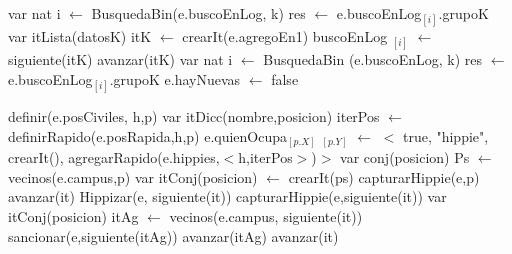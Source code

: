 \begin{algorithm}[H]
\begin{algorithmic}[1]
 
	 
		 \State var nat i $\gets$ BusquedaBin(e.buscoEnLog, k) 
		 \State res $\gets$ e.buscoEnLog$_{[i]}$.grupoK 
	\Else
		 \State var itLista(datosK) itK $\gets$ crearIt(e.agregoEn1) 
		  
		 	\State buscoEnLog $_{[i]}$ $\gets$ siguiente(itK) 
		 	\State avanzar(itK)
		 \EndWhile
		 \State var nat i $\gets$ BusquedaBin (e.buscoEnLog, k) 
		 \State res $\gets$ e.buscoEnLog$_{[i]}$.grupoK 
		 \State e.hayNuevas $\gets$ false 
	\EndIf
\EndFunction
\end{algorithmic}
\end{algorithm}


\begin{algorithm}[H]
\begin{algorithmic}[1]
 
	\State definir(e.posCiviles, h,p) 
	\State var itDicc(nombre,posicion) iterPos $\gets$ definirRapido(e.posRapida,h,p) 
	\State e.quienOcupa$_{[p.X]}$ $_{[p.Y]}$ $\gets$ $<$ true, "hippie", crearIt(), agregarRapido(e.hippies,$<$h,iterPos$>$)$>$ 
	\State var conj(posicion) Ps $\gets$ vecinos(e.campus,p) 
	\State var itConj(posicion) $\gets$ crearIt(ps) 
	 
		\State capturarHippie(e,p) 
	\Else
		 
			 
				\State avanzar(it) 
			\Else
				 
					\State Hippizar(e, siguiente(it)) 
						 
						\State capturarHippie(e,siguiente(it))  
					\EndIf 
				\Else 
					 
						\State var itConj(posicion) itAg $\gets$ vecinos(e.campus, siguiente(it)) 
						 
							 
								\State sancionar(e,siguiente(itAg)) 
							\EndIf
							\State avanzar(itAg)
						\EndWhile
   					 \EndIf
				\EndIf
			\EndIf
			\State avanzar(it)
		\EndWhile
	\EndIf
\EndFunction
\end{algorithmic}
\end{algorithm}

